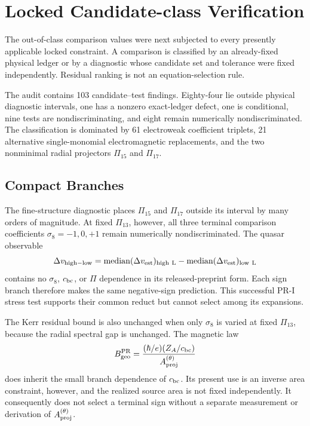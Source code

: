 \section{Locked Candidate-class Verification}
\label{app:branch-elimination}

The out-of-class comparison values were next subjected to every presently applicable locked constraint.  A comparison is classified by an already-fixed physical ledger or by a diagnostic whose candidate set and tolerance were fixed independently.  Residual ranking is not an equation-selection rule.

The audit contains 103 candidate--test findings.  Eighty-four lie outside physical diagnostic intervals, one has a nonzero exact-ledger defect, one is conditional, nine tests are nondiscriminating, and eight remain numerically nondiscriminated.  The classification is dominated by 61 electroweak coefficient triplets, 21 alternative single-monomial electromagnetic replacements, and the two nonminimal radial projectors $\Pi_{15}$ and $\Pi_{17}$.

\subsection{Compact Branches}

The fine-structure diagnostic places $\Pi_{15}$ and $\Pi_{17}$ outside its interval by many orders of magnitude.  At fixed $\Pi_{13}$, however, all three terminal comparison coefficients $\sigma_8=-1,0,+1$ remain numerically nondiscriminated.  The quasar observable
\begin{equation}
 \Delta v_{\rm high-low}
 =\operatorname{median}(\Delta v_{\rm est})_{\rm high\ L}
 -\operatorname{median}(\Delta v_{\rm est})_{\rm low\ L}
 \label{eq:pr35-quasar-nondiscrimination}
\end{equation}
contains no $\sigma_8$, $c_{\rm bc}$, or $\Pi$ dependence in its released-preprint form.  Each sign branch therefore makes the same negative-sign prediction. This successful PR-I stress test supports their common reduct but cannot select among its expansions.

The Kerr residual bound \cite{Kerr_1963} is also unchanged when only $\sigma_8$ is varied at fixed $\Pi_{13}$, because the radial spectral gap is unchanged.  The magnetic law
\begin{equation}
 B_{\rm geo}^{\rm PR}
 =\frac{(\hbar/e)(Z_A/c_{\rm bc})}{A_{\rm proj}^{(\theta)}}
 \label{eq:pr35-magnetic-nondiscrimination}
\end{equation}
does inherit the small branch dependence of $c_{\rm bc}$.  Its present use is an inverse area constraint, however, and the realized source area is not fixed independently.  It consequently does not select a terminal sign without a separate measurement or derivation of $A_{\rm proj}^{(\theta)}$.

